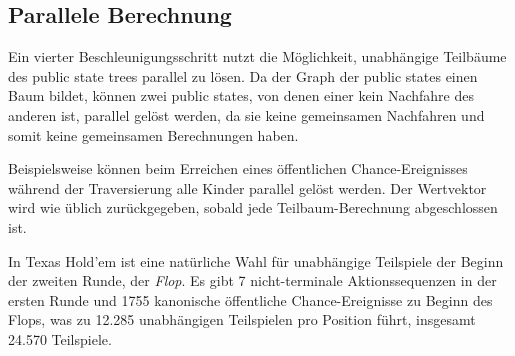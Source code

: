 \subsection{Parallele Berechnung}

Ein vierter Beschleunigungsschritt nutzt die Möglichkeit, unabhängige Teilbäume des public state trees parallel zu lösen.
Da der Graph der public states einen Baum bildet, können zwei public states, von denen einer kein Nachfahre des anderen ist, parallel gelöst werden, da sie keine gemeinsamen Nachfahren und somit keine gemeinsamen Berechnungen haben.

Beispielsweise können beim Erreichen eines öffentlichen Chance-Ereignisses während der Traversierung alle Kinder parallel gelöst werden.
Der Wertvektor wird wie üblich zurückgegeben, sobald jede Teilbaum-Berechnung abgeschlossen ist.

In Texas Hold'em ist eine natürliche Wahl für unabhängige Teilspiele der Beginn der zweiten Runde, der \emph{Flop}.
Es gibt 7 nicht-terminale Aktionssequenzen in der ersten Runde und 1755 kanonische öffentliche Chance-Ereignisse zu Beginn des Flops, was zu 12.285 unabhängigen Teilspielen pro Position führt, insgesamt 24.570 Teilspiele.

